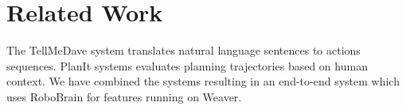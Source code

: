 \section{Related Work}
The TellMeDave system translates natural language sentences to actions
sequences. PlanIt systems evaluates planning trajectories based on human
context. We have combined the systems resulting in an end-to-end system which
uses RoboBrain for features running on Weaver. 

